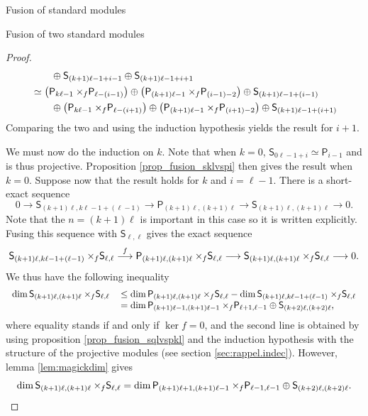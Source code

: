 \documentclass[reqno]{amsart}
\newcommand{\ds}[1]{\mathsf S_{#1}}
\newcommand{\dP}[1]{\mathsf P_{#1}}
\newcommand{\xf}{\times\hspace{-0.27em}_f}
\newcommand{\lc}{\ell}
\begin{document}
\begin{section}{Fusion of standard modules}
\begin{subsection}{Fusion of two standard modules}
\begin{proof}
\begin{align}
	& \qquad \oplus \ds{(k+1)\lc -1+i-1}\oplus \ds{(k+1)\lc -1 + i+1}\notag\\
	& \simeq  \left(\dP{k \lc -1} \xf \dP{\lc -(i-1)}\right) \oplus \left(\dP{(k+1)\lc -1} \xf \dP{(i-1) - 2}\right) \oplus \ds{(k+1)\lc -1+(i-1)} \notag\\
	& \qquad \oplus  \left(\dP{k \lc -1} \xf \dP{\lc -(i+1)}\right) \oplus \left(\dP{(k+1)\lc -1} \xf \dP{(i+1) - 2}\right) \oplus \ds{(k+1)\lc -1+(i+1)}
\end{align}
 Comparing the two and using the induction hypothesis yields the result for $i+1$.

We must now do the induction on $k$. Note that when $k=0$, $\ds{0 \lc -1+i} \simeq \dP{i-1}$ and is thus projective. Proposition \ref{prop_fusion_sklvspi} then gives the result when $k=0$. Suppose now that the result holds for $k$ and $i=\lc-1$. There is a short-exact sequence
\begin{equation}
0 \longrightarrow \ds{(k+1) \lc, k \lc -1 + (\lc-1)} \longrightarrow \dP{(k+1 )\lc,(k+1) \lc} \longrightarrow \ds{(k+1) \lc, (k+1) \lc} \longrightarrow 0.
\end{equation} 
Note that the $n = (k+1) \lc$ is important in this case so it is written explicitly. Fusing this sequence with $\ds{\lc,\lc}$ gives the exact sequence
\begin{equation}
\ds{(k+1) \lc, k \lc -1 + (\lc-1)}\xf \ds{\lc,\lc} \overset{f}{\longrightarrow} \dP{(k+1)\lc, (k+1) \lc}\xf \ds{\lc,\lc} \longrightarrow \ds{(k+1) \lc, (k+1) \lc}\xf \ds{\lc,\lc} \longrightarrow 0.
\end{equation}
We thus have the following inequality
\begin{equation}
\begin{tabular}{r l}
$\dim{\ds{(k+1) \lc,(k+1) \lc} \xf \ds{\lc,\lc}} $&$\leq \dim{\dP{(k+1)\lc,(k+1)\lc} \xf \ds{\lc,\lc}} - \dim{\ds{(k+1) \lc, k \lc -1 + (\lc-1)}\xf \ds{\lc,\lc} }$\\
& $= \dim{\dP{(k+1)\lc-1, (k+1)\lc -1} \xf \dP{\lc+1,\lc -1} \oplus \ds{(k+2)\lc,(k+2)\lc}}$, 
\end{tabular}
\end{equation}
where equality stands if and only if $\ker f = 0$, and the second line is obtained by using proposition \ref{prop_fusion_sqlvspkl} and the induction hypothesis with the structure of the projective modules (see section \ref{sec:rappel.indec}). However, lemma \ref{lem:magickdim} gives
$$\dim \ds{(k+1)\lc, (k+1) \lc} \xf \ds{\lc,\lc} = \dim{\dP{(k+1)\lc+1, (k+1)\lc -1} \xf \dP{\lc-1, \lc -1} \oplus \ds{(k+2)\lc,(k+2)\lc}}. $$

\end{proof}
\end{subsection}
\end{section}
\end{document}
